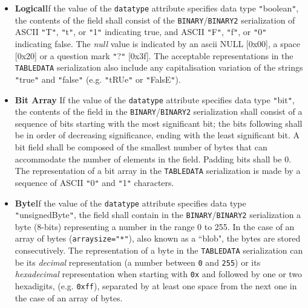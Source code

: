 \documentclass[11pt,a4paper]{ivoa}
\let\fg=\color
\def\attr#1{{\tt{\fg{DarkRed}#1}}}
\def\elem#1{{\tt{\fg{DarkRed}#1}}}
\def\attrval#1#2{{\tt{\fg{DarkRed}#1}="{\fg{DarkPurple}#2}"}}
\def\literalvalue#1{{\tt"}{{\fg{DarkPurple}#1}}{\tt"}}
\begin{document}
\begin{itemize}
\item {\bf Logical}\quad If the value of the {\attr{datatype}}
attribute specifies data type {\literalvalue{boolean}},
the contents of the field{ }shall consist of the \elem{BINARY}/\elem{BINARY2} serialization of
ASCII \literalvalue{T}, \literalvalue{t},  or \literalvalue{1} indicating true, and
ASCII \literalvalue{F}, \literalvalue{f}, or \literalvalue{0} indicating false.
The {\em null} value is indicated by an ascii NULL [0x00],
a space [0x20]
or a question mark \literalvalue{?} [0x3f].
The acceptable representations in the \elem{TABLEDATA} serialization
also include any capitalisation variation of the
strings \literalvalue{true}  and \literalvalue{false} (e.g. \literalvalue{tRUe} or \literalvalue{FalsE}).

\item {\bf Bit Array} \quad If the value of the {\attr{datatype}}
attribute specifies data type {\literalvalue{bit}},
the contents of the field{ }in the \elem{BINARY}/\elem{BINARY2} serialization shall consist of
a sequence of bits starting with the most significant bit; the bits
following shall be in order of decreasing significance, ending with
the least significant bit. A bit field shall be composed of the
smallest number of bytes that can accommodate the number of elements
in the field. Padding bits shall be 0.
The representation of a bit array in the \elem{TABLEDATA} serialization
is made by a sequence of ASCII \literalvalue{0} and \literalvalue{1} characters.

\item {\bf Byte}\quad If the value of the {\attr{datatype}}
attribute specifies data type {\literalvalue{unsignedByte}},
the field shall contain in the \elem{BINARY}/\elem{BINARY2} serialization a byte
(8-bits) representing a number in the
range 0 to 255.
In the case of an array of bytes (\attrval{arraysize}{*}),
also known as a ``blob", the bytes are stored consecutively.
The representation of a byte in the \elem{TABLEDATA} serialization
can be its {\em decimal} representation (a number between {\tt0} and {\tt255})
or its {\em hexadecimal} representation when starting with {\tt0x} and
followed by one or two hexadigits,
(e.g. {\tt0xff}), separated by at least one space from the next one
in the case of an array of bytes.


\end{itemize}
\end{document}
